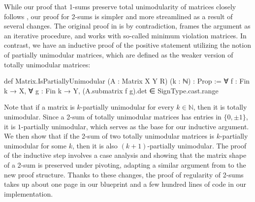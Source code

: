 While our proof that 1-sums preserve total unimodularity of matrices closely follows \cite{Truemper2016}, our proof for 2-sums is simpler and more streamlined as a result of several changes. The original proof in \cite{Truemper2016} is by contradiction, frames the argument as an iterative procedure, and works with so-called minimum violation matrices. In contrast, we have an inductive proof of the positive statement utilizing the notion of partially unimodular matrices, which are defined as the weaker version of totally unimodular matrices:
\begin{leancode}
def Matrix.IsPartiallyUnimodular
    (A : Matrix X Y R) (k : ℕ) : Prop :=
  ∀ f : Fin k → X, ∀ g : Fin k → Y,
    (A.submatrix f g).det ∈ SignType.cast.range
\end{leancode}
Note that if a matrix is $k$-partially unimodular for every $k \in \mathbb{N}$, then it is totally unimodular. Since a 2-sum of totally unimodular matrices has entries in $\{0, \pm 1\}$, it is $1$-partially unimodular, which serves as the base for our inductive argument. We then show that if the 2-sum of two totally unimodular matrices is $k$-partially unimodular for some $k$, then it is also $(k + 1)$-partially unimodular. The proof of the inductive step involves a case analysis and showing that the matrix shape of a 2-sum is preserved under pivoting, adapting a similar argument from \cite{Truemper2016} to the new proof structure. Thanks to these changes, the proof of regularity of 2-sums takes up about one page in our blueprint and a few hundred lines of code in our implementation.



